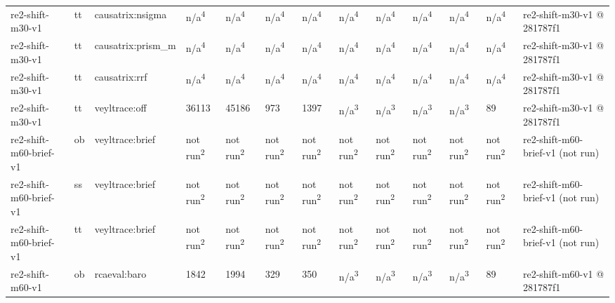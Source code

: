 \begin{table}[t]
\begin{tabular}{lllllllllllll}
re2-shift-m30-v1 & tt & causatrix:nsigma & n/a\textsuperscript{4} & n/a\textsuperscript{4} & n/a\textsuperscript{4} & n/a\textsuperscript{4} & n/a\textsuperscript{4} & n/a\textsuperscript{4} & n/a\textsuperscript{4} & n/a\textsuperscript{4} & n/a\textsuperscript{4} & re2-shift-m30-v1 @ 281787f1 \\
re2-shift-m30-v1 & tt & causatrix:prism\_m & n/a\textsuperscript{4} & n/a\textsuperscript{4} & n/a\textsuperscript{4} & n/a\textsuperscript{4} & n/a\textsuperscript{4} & n/a\textsuperscript{4} & n/a\textsuperscript{4} & n/a\textsuperscript{4} & n/a\textsuperscript{4} & re2-shift-m30-v1 @ 281787f1 \\
re2-shift-m30-v1 & tt & causatrix:rrf & n/a\textsuperscript{4} & n/a\textsuperscript{4} & n/a\textsuperscript{4} & n/a\textsuperscript{4} & n/a\textsuperscript{4} & n/a\textsuperscript{4} & n/a\textsuperscript{4} & n/a\textsuperscript{4} & n/a\textsuperscript{4} & re2-shift-m30-v1 @ 281787f1 \\
re2-shift-m30-v1 & tt & veyltrace:off & 36113 & 45186 & 973 & 1397 & n/a\textsuperscript{3} & n/a\textsuperscript{3} & n/a\textsuperscript{3} & n/a\textsuperscript{3} & 89 & re2-shift-m30-v1 @ 281787f1 \\
re2-shift-m60-brief-v1 & ob & veyltrace:brief & not run\textsuperscript{2} & not run\textsuperscript{2} & not run\textsuperscript{2} & not run\textsuperscript{2} & not run\textsuperscript{2} & not run\textsuperscript{2} & not run\textsuperscript{2} & not run\textsuperscript{2} & not run\textsuperscript{2} & re2-shift-m60-brief-v1 (not run) \\
re2-shift-m60-brief-v1 & ss & veyltrace:brief & not run\textsuperscript{2} & not run\textsuperscript{2} & not run\textsuperscript{2} & not run\textsuperscript{2} & not run\textsuperscript{2} & not run\textsuperscript{2} & not run\textsuperscript{2} & not run\textsuperscript{2} & not run\textsuperscript{2} & re2-shift-m60-brief-v1 (not run) \\
re2-shift-m60-brief-v1 & tt & veyltrace:brief & not run\textsuperscript{2} & not run\textsuperscript{2} & not run\textsuperscript{2} & not run\textsuperscript{2} & not run\textsuperscript{2} & not run\textsuperscript{2} & not run\textsuperscript{2} & not run\textsuperscript{2} & not run\textsuperscript{2} & re2-shift-m60-brief-v1 (not run) \\
re2-shift-m60-v1 & ob & rcaeval:baro & 1842 & 1994 & 329 & 350 & n/a\textsuperscript{3} & n/a\textsuperscript{3} & n/a\textsuperscript{3} & n/a\textsuperscript{3} & 89 & re2-shift-m60-v1 @ 281787f1 \\

\end{tabular}
\end{table}

